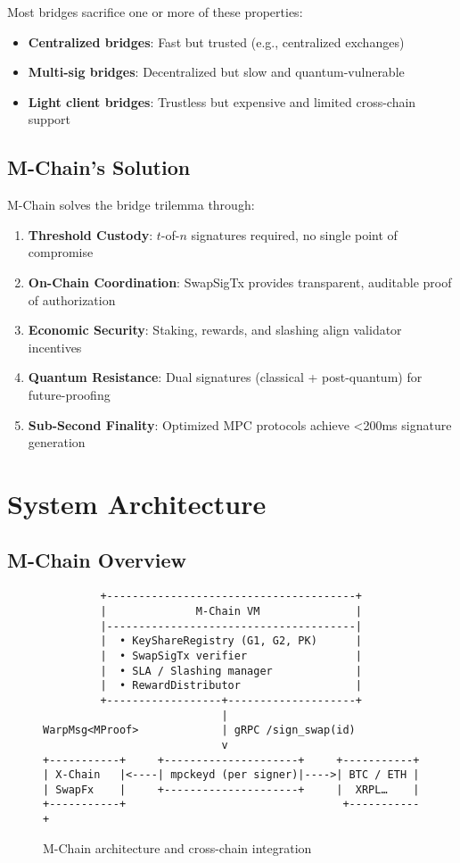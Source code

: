 \documentclass[11pt]{article}
\begin{document}
Most bridges sacrifice one or more of these properties:
\begin{itemize}
\item \textbf{Centralized bridges}: Fast but trusted (e.g., centralized exchanges)
\item \textbf{Multi-sig bridges}: Decentralized but slow and quantum-vulnerable
\item \textbf{Light client bridges}: Trustless but expensive and limited cross-chain support
\end{itemize}

\subsection{M-Chain's Solution}

M-Chain solves the bridge trilemma through:

\begin{enumerate}
\item \textbf{Threshold Custody}: $t$-of-$n$ signatures required, no single point of compromise
\item \textbf{On-Chain Coordination}: SwapSigTx provides transparent, auditable proof of authorization
\item \textbf{Economic Security}: Staking, rewards, and slashing align validator incentives
\item \textbf{Quantum Resistance}: Dual signatures (classical + post-quantum) for future-proofing
\item \textbf{Sub-Second Finality}: Optimized MPC protocols achieve <200ms signature generation
\end{enumerate}

\section{System Architecture}

\subsection{M-Chain Overview}

\begin{figure}[h]
\centering
\begin{verbatim}
         +---------------------------------------+
         |              M-Chain VM               |
         |---------------------------------------|
         |  • KeyShareRegistry (G1, G2, PK)      |
         |  • SwapSigTx verifier                 |
         |  • SLA / Slashing manager             |
         |  • RewardDistributor                  |
         +------------------+--------------------+
                            |
WarpMsg<MProof>             | gRPC /sign_swap(id)
                            v
+-----------+     +---------------------+     +-----------+
| X-Chain   |<----| mpckeyd (per signer)|---->| BTC / ETH |
| SwapFx    |     +---------------------+     |  XRPL…    |
+-----------+                                  +-----------+
\end{verbatim}
\caption{M-Chain architecture and cross-chain integration}
\label{fig:architecture}
\end{figure}
\end{document}
